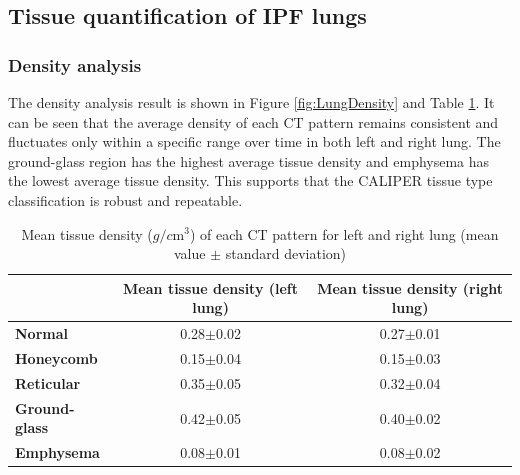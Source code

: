 
\subsection{Tissue quantification of IPF lungs}
\subsubsection{Density analysis}
The density analysis result is shown in Figure \ref{fig:LungDensity} and Table \ref{tab:MeanDensity}. It can be seen that the average density of each CT pattern remains consistent and fluctuates only within a specific range over time in both left and right lung. The ground-glass region has the highest average tissue density and emphysema has the lowest average tissue density. This supports that the CALIPER tissue type classification is robust and repeatable.

\begin{table}[htbp]
\centering
\caption{Mean tissue density ($g/c\mathrm{m^3}$) of each CT pattern for left and right lung (mean value $\pm$ standard deviation)}
\label{tab:MeanDensity}
\begin{tabular}{|l | c | c|}
\hline
& \bf{Mean tissue density (left lung)} & \bf{Mean tissue density (right lung)} \\ 
\hline
\bf{Normal} & 0.28$\pm$0.02 & 0.27$\pm$0.01 \\
\hline
\bf{Honeycomb} & 0.15$\pm$0.04 & 0.15$\pm$0.03 \\
\hline
\bf{Reticular} & 0.35$\pm$0.05 & 0.32$\pm$0.04 \\
\hline
\bf{Ground-glass} & 0.42$\pm$0.05 & 0.40$\pm$0.02 \\
\hline
\bf{Emphysema} & 0.08$\pm$0.01 & 0.08$\pm$0.02 \\
\hline
\end{tabular}
\end{table}


